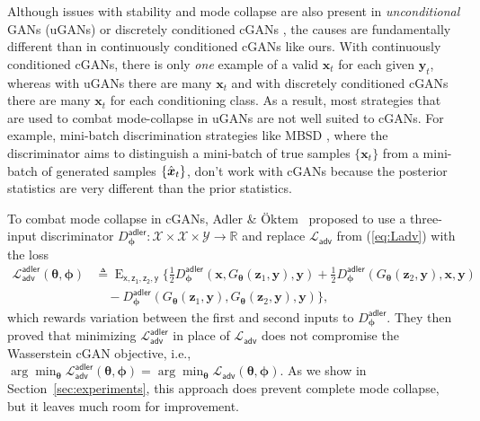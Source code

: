 \documentclass{article}
\theoremstyle{plain}
\theoremstyle{definition}
\theoremstyle{remark}
\newcommand{\defn}{\triangleq}
\newcommand{\hvec}[1]{\ensuremath{\Hat{\boldsymbol{#1}}}}
\renewcommand{\vec}[1]{\ensuremath{\boldsymbol{#1}}}
\newcommand{\mc}[1]{\ensuremath{\mathcal{#1}}}
\newcommand{\Real}{{\mathbb{R}}}
\DeclareMathOperator{\E}{E}
\renewcommand{\eqref}[1]{(\ref{eq:#1})}
\newcommand{\secref}[1]{Section~\ref{sec:#1}}
\newcommand{\Exzzy}{\E_{\mathsf{x,z_1,z_2,y}}}
\newcommand{\Dadler}{D^{\mathsf{adler}}}
\newcommand{\Ladler}{\mc{L}^{\mathsf{adler}}_{\mathsf{adv}}}
\newcommand{\Ladv}{\mc{L}_{\mathsf{adv}}}
\begin{document}
Although issues with stability and mode collapse are also present in \emph{unconditional} GANs (uGANs) or discretely conditioned cGANs \cite{Mirza:14},
the causes are fundamentally different than in continuously conditioned cGANs like ours. 
With continuously conditioned cGANs, there is only \emph{one} example of a valid $\vec{x}_t$ for each given $\vec{y}_t$, whereas with uGANs there are many $\vec{x}_t$ and with discretely conditioned cGANs there are many $\vec{x}_t$ for each conditioning class.
As a result, most strategies that are used to combat mode-collapse in uGANs \cite{Schonfeld:CVPR:20,Karras:NIPS:20,Zhao:AAAI:21} are not well suited to cGANs.
For example, mini-batch discrimination strategies like MBSD \cite{Karras:ICLR:18}%
, where the discriminator aims to distinguish a mini-batch of true samples $\{\vec{x}_t\}$ from a mini-batch of generated samples $\{\hvec{x}_t\}$,
don't work with cGANs because the posterior statistics are very different than the prior statistics. 

To combat mode collapse in cGANs, Adler \& \"Oktem~\cite{Adler:18} proposed to use a three-input discriminator $\Dadler_{\vec{\phi}}:\mc{X}\times\mc{X}\times\mc{Y}\rightarrow \Real$ and replace $\Ladv$ from \eqref{Ladv} with the loss 
\begin{align}
\Ladler(\vec{\theta},\vec{\phi}) 
&\defn \Exzzy\big\{ 
        \tfrac{1}{2}\Dadler_{\vec{\phi}}(\vec{x},G_{\vec{\theta}}(\vec{z}_1,\vec{y}),\vec{y}) + \tfrac{1}{2}\Dadler_{\vec{\phi}}(G_{\vec{\theta}}(\vec{z}_2,\vec{y}),\vec{x},\vec{y})
        \nonumber\\&\quad
        - \Dadler_{\vec{\phi}}(G_{\vec{\theta}}(\vec{z}_1,\vec{y}),G_{\vec{\theta}}(\vec{z}_2,\vec{y}),\vec{y})
         \big\} 
\label{eq:Ladler},
\end{align}
which rewards variation between the first and second inputs to $\Dadler_{\vec{\phi}}$.
They then proved that minimizing $\Ladler$ in place of $\Ladv$ does not compromise the Wasserstein cGAN objective, i.e., $\arg\min_{\vec{\theta}} \Ladler(\vec{\theta},\vec{\phi}) = \arg\min_{\vec{\theta}} \Ladv(\vec{\theta},\vec{\phi})$.
As we show in \secref{experiments}, this approach does prevent complete mode collapse, but it leaves much room for improvement.
\end{document}
